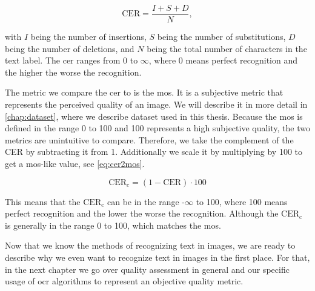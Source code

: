 \begin{equation}
    \text{CER} = \frac{I + S + D}{N},
    \label{eq:cer}
\end{equation}

with $I$ being the number of insertions, $S$ being the number of substitutions, $D$ being the number of deletions, and $N$ being the total number of characters in the text label.
The \gls{cer} ranges from 0 to $\infty$, where 0 means perfect recognition and the higher the worse the recognition.

The metric we compare the \gls{cer} to is the \gls{mos}.
It is a subjective metric that represents the perceived quality of an image.
We will describe it in more detail in \autoref{chap:dataset}, where we describe dataset used in this thesis.
Because the \gls{mos} is defined in the range 0 to 100 and 100 represents a high subjective quality, the two metrics are unintuitive to compare.
Therefore, we take the complement of the CER by subtracting it from 1.
Additionally we scale it by multiplying by 100 to get a \gls{mos}-like value, see \autoref{eq:cer2mos}.

\begin{equation}
    \text{CER}_{c} = (1 - \text{CER}) \cdot 100
    \label{eq:cer2mos}
\end{equation}

This means that the $\text{CER}_{\text{c}}$ can be in the range -$\infty$ to 100, where 100 means perfect recognition and the lower the worse the recognition.
Although the $\text{CER}_{\text{c}}$ is generally in the range 0 to 100, which matches the \gls{mos}.

Now that we know the methods of recognizing text in images, we are ready to describe why we even want to recognize text in images in the first place.
For that, in the next chapter we go over quality assessment in general and our specific usage of \gls{ocr} algorithms to represent an objective quality metric.









